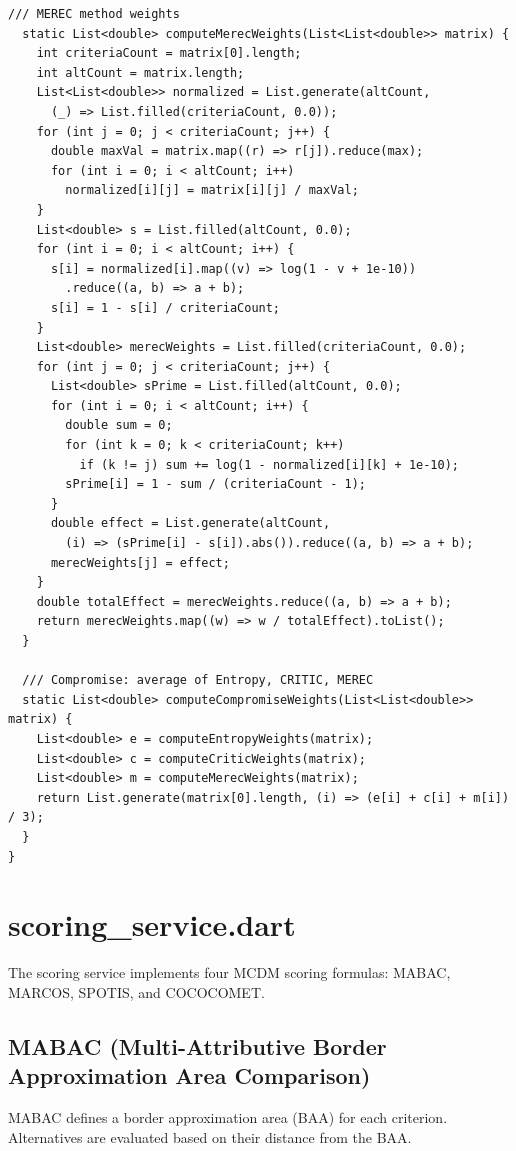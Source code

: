 \documentclass[12pt,a4paper,oneside]{report}
\begin{document}
\begin{lstlisting}[style=dartstyle]
  /// MEREC method weights
  static List<double> computeMerecWeights(List<List<double>> matrix) {
    int criteriaCount = matrix[0].length;
    int altCount = matrix.length;
    List<List<double>> normalized = List.generate(altCount,
      (_) => List.filled(criteriaCount, 0.0));
    for (int j = 0; j < criteriaCount; j++) {
      double maxVal = matrix.map((r) => r[j]).reduce(max);
      for (int i = 0; i < altCount; i++)
        normalized[i][j] = matrix[i][j] / maxVal;
    }
    List<double> s = List.filled(altCount, 0.0);
    for (int i = 0; i < altCount; i++) {
      s[i] = normalized[i].map((v) => log(1 - v + 1e-10))
        .reduce((a, b) => a + b);
      s[i] = 1 - s[i] / criteriaCount;
    }
    List<double> merecWeights = List.filled(criteriaCount, 0.0);
    for (int j = 0; j < criteriaCount; j++) {
      List<double> sPrime = List.filled(altCount, 0.0);
      for (int i = 0; i < altCount; i++) {
        double sum = 0;
        for (int k = 0; k < criteriaCount; k++)
          if (k != j) sum += log(1 - normalized[i][k] + 1e-10);
        sPrime[i] = 1 - sum / (criteriaCount - 1);
      }
      double effect = List.generate(altCount,
        (i) => (sPrime[i] - s[i]).abs()).reduce((a, b) => a + b);
      merecWeights[j] = effect;
    }
    double totalEffect = merecWeights.reduce((a, b) => a + b);
    return merecWeights.map((w) => w / totalEffect).toList();
  }

  /// Compromise: average of Entropy, CRITIC, MEREC
  static List<double> computeCompromiseWeights(List<List<double>> matrix) {
    List<double> e = computeEntropyWeights(matrix);
    List<double> c = computeCriticWeights(matrix);
    List<double> m = computeMerecWeights(matrix);
    return List.generate(matrix[0].length, (i) => (e[i] + c[i] + m[i]) / 3);
  }
}
\end{lstlisting}

\section{scoring\_service.dart}

The scoring service implements four MCDM scoring formulas: MABAC, MARCOS, SPOTIS, and COCOCOMET.

\subsection{MABAC (Multi-Attributive Border Approximation Area Comparison)}

MABAC defines a border approximation area (BAA) for each criterion. Alternatives are evaluated based on their distance from the BAA.
\end{document}

